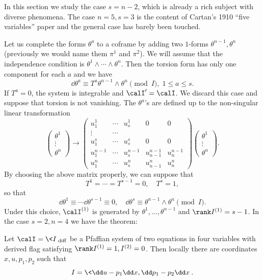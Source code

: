 In this section we study the case $s=n-2$, which is already a rich subject with diverse phenomena. The case $n=5,s=3$ is the content of Cartan's 1910 ``five variables'' paper and the general case has barely been touched.

Let us complete the forms $\theta^a$ to a coframe by adding two $1$-forms $\theta^{n-1},\theta^{n}$ (previously we would name them $\pi^1$ and $\pi^2$). We will assume that the independence condition is $\theta^1\wedge\cdots\wedge\theta^n$. Then the torsion form has only one component for each $a$ and we have 
\[\dd\theta^a\equiv T^a \theta^{n-1}\wedge\theta^n \pmod{I}, \; 1\leq a\leq s.\]
If $T^a=0$, the system is integrable and $\calI'=\calI$. We discard this case and suppose that torsion is not vanishing. The $\theta^a$'s are defined up to the non-singular linear transformation 
\[
\begin{pmatrix}
    \theta^1 \\
    \vdots \\
    \theta^n
\end{pmatrix}\to 
\begin{pmatrix}
    u^1_1 & \cdots & u^1_s & 0 & 0\\
    \vdots & \cdots & & &\\
    u^s_1 & \cdots & u^s_s & 0 & 0\\
    u^{n-1}_1 & \cdots & u^{n-1}_s & u^{n-1}_{n-1}& u^{n-1}_n\\
    u^n_1 & \cdots & u^n_s & u^n_{n-1} & u^n_n
\end{pmatrix}
\begin{pmatrix}
    \theta^1 \\
    \vdots \\
    \theta^n
\end{pmatrix}.
\]
By choosing the above matrix properly, we can suppose that 
\[T^1=\cdots =T^{s-1}=0,\quad T^s=1,\]
so that 
\[\dd \theta^1\equiv \cdots \dd\theta^{s-1}\equiv 0,\quad \dd\theta^s\equiv \theta^{n-1}\wedge\theta^n \pmod{I}.\label{eq 31 Bryant}\]
Under this choice, $\calI^{(1)}$ is generated by $\theta^1,\ldots,\theta^{n-1}$ and $\rank I^{(1)}=s-1$. In the case $s=2,n=4$ we have the theorem:

\begin{thm}\label{thm 5.1 Bryant}
    Let $\calI=\<I\>_{\mathrm{diff}}$ be a Pfaffian system of two equations in four variables with derived flag satisfying $\rank I^{(1)}=1, I^{{(2)}}=0$. Then locally there are coordinates $x,u,p_1,p_2$ such that 
    \[I=\<\dd u-p_1\dd x,\dd p_1-p_2\dd x\>.\]
\end{thm}

